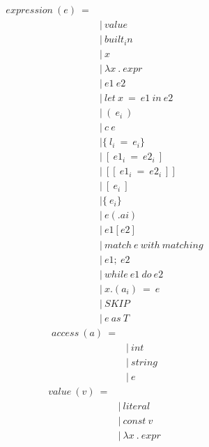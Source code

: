 \documentclass[10pt,a4paper]{article}
\begin{document}
\begin{align*}
expression\ (e)\ = 
\\
 \ &|\ value                        \tag{values}
\\
 \ &|\ built_in                     \tag{built-in\ function}
\\
 \ &|\ x                            \tag{variables}
\\
 \ &|\ \lambda x\ .\ expr                    \tag{lambda}
\\
 \ &|\ e1\ e2                        \tag{application}
\\
 \ &|\ let\ x\ =\ e1\ in\ e2             \tag{let\ in}
\\
 \ &|\ (\ e_i\ )                      \tag{tuple}
\\
 \ &|\ c\ e                          \tag{constructor}
\\
 \ &| \{\ l_i\ =\ e_i \}                \tag{record}
\\
 \ &|\ [\ e1_i\ =\ e2_i\ ]              \tag{map}
\\
 \ &|\ [[\ e1_i\ =\ e2_i\ ]]            \tag{big\ map}
\\
 \ &|\ [\ e_i\ ]                      \tag{list}
\\
 \ &| \{\ e_i \}                      \tag{set}
\\
 \ &|\ e(.ai)                       \tag{accessor}
\\
 \ &|\ e1[e2]                       \tag{look\ up}
\\
 \ &|\ match\ e\ with\ matching        \tag{matching}
\\
 \ &|\ e1;\ e2                       \tag{sequence}
\\
 \ &|\ while\ e1\ do\ e2               \tag{loop}
\\
 \ &|\ x.(a_i)\ =\ e                  \tag{assign}
\\
 \ &|\ SKIP                         \tag{skip}
\\
 \ &|\ e\ as\ T                       \tag{ascription}
\end{align*}
\begin{align*}
access\ (a)\ = 
\\
 \ &|\ int    \tag{for\ tuples}
\\
 \ &|\ string \tag{for\ record}
\\
 \ &|\ e      \tag{for\ map}
\end{align*}
\begin{align*}
value\ (v)\ = 
\\
 \ &|\ literal                      \tag{values\ of\ built-in\ types}
\\
 \ &|\ const\ v                      \tag{values\ of\ construct\ types}
\\
 \ &|\ \lambda x\ .\ expr                    \tag{lambda}
\end{align*}
\end{document}
